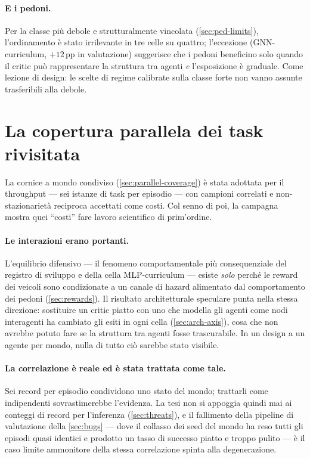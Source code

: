 \paragraph{E i pedoni.}
Per la classe più debole e strutturalmente vincolata
(\cref{sec:ped-limits}), l'ordinamento è stato irrilevante in tre celle
su quattro; l'eccezione (GNN-curriculum, $+12$\,pp in valutazione)
suggerisce che i pedoni beneficino solo quando il critic può
rappresentare la struttura tra agenti \emph{e} l'esposizione è
graduale. Come lezione di design: le scelte di regime calibrate sulla
classe forte non vanno assunte trasferibili alla debole.

\section{La copertura parallela dei task rivisitata}
\label{sec:ptc-revisited}

La cornice a mondo condiviso (\cref{sec:parallel-coverage}) è stata
adottata per il throughput --- sei istanze di task per episodio --- con
campioni correlati e non-stazionarietà reciproca accettati come costi.
Col senno di poi, la campagna mostra quei ``costi'' fare lavoro
scientifico di prim'ordine.

\paragraph{Le interazioni erano portanti.}
L'equilibrio difensivo --- il fenomeno comportamentale più
consequenziale del registro di sviluppo e della cella MLP-curriculum
--- esiste \emph{solo} perché le reward dei veicoli sono condizionate a
un canale di hazard alimentato dal comportamento dei pedoni
(\cref{sec:rewards}). Il risultato architetturale speculare punta nella
stessa direzione: sostituire un critic piatto con uno che modella gli
agenti come nodi interagenti ha cambiato gli esiti in ogni cella
(\cref{sec:arch-axis}), cosa che non avrebbe potuto fare se la
struttura tra agenti fosse trascurabile. In un design a un agente per
mondo, nulla di tutto ciò sarebbe stato visibile.

\paragraph{La correlazione è reale ed è stata trattata come tale.}
Sei record per episodio condividono uno stato del mondo; trattarli come
indipendenti sovrastimerebbe l'evidenza. La tesi non si appoggia quindi
mai ai conteggi di record per l'inferenza (\cref{sec:threats}), e il
fallimento della pipeline di valutazione della \cref{sec:bugs} --- dove
il collasso dei seed del mondo ha reso tutti gli episodi
quasi identici e prodotto un tasso di successo piatto e troppo pulito
--- è il caso limite ammonitore della stessa correlazione spinta alla
degenerazione.

